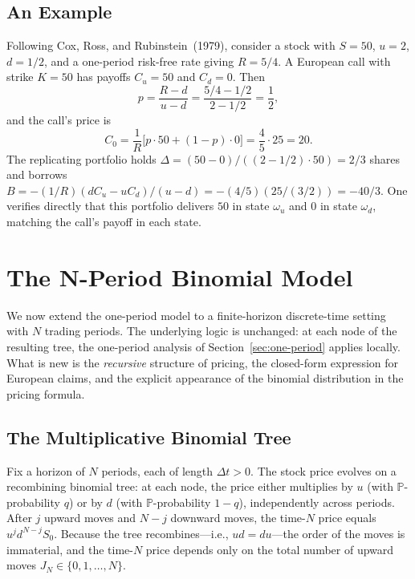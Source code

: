 \documentclass[11pt,a4paper]{article}
\theoremstyle{plain}
\theoremstyle{definition}
\newcommand{\Prob}{\mathbb{P}}
\begin{document}
\subsection{An Example}
\label{subsec:example-1period}

Following Cox, Ross, and Rubinstein~(1979), consider a stock with
$S = 50$, $u = 2$, $d = 1/2$, and a one-period risk-free rate giving
$R = 5/4$. A European call with strike $K = 50$ has payoffs $C_u = 50$
and $C_d = 0$. Then
\[
p = \frac{R - d}{u - d} = \frac{5/4 - 1/2}{2 - 1/2} = \frac{1}{2},
\]
and the call's price is
\[
C_0 = \frac{1}{R}\bigl[p \cdot 50 + (1-p) \cdot 0\bigr]
    = \frac{4}{5} \cdot 25 = 20.
\]
The replicating portfolio holds $\Delta = (50 - 0) / ((2 - 1/2) \cdot 50)
= 2/3$ shares and borrows $B = -(1/R)(d C_u - u C_d)/(u - d) =
-(4/5)(25/(3/2)) = -40/3$. One verifies directly that this portfolio
delivers $50$ in state $\omega_u$ and $0$ in state $\omega_d$, matching
the call's payoff in each state.

\section{The N-Period Binomial Model}
\label{sec:n-period}

We now extend the one-period model to a finite-horizon discrete-time
setting with $N$ trading periods. The underlying logic is unchanged: at
each node of the resulting tree, the one-period analysis of
Section~\ref{sec:one-period} applies locally. What is new is the
\emph{recursive} structure of pricing, the closed-form expression for
European claims, and the explicit appearance of the binomial distribution
in the pricing formula.

\subsection{The Multiplicative Binomial Tree}
\label{subsec:tree}

Fix a horizon of $N$ periods, each of length $\Delta t > 0$. The stock
price evolves on a recombining binomial tree: at each node, the price
either multiplies by $u$ (with $\Prob$-probability $q$) or by $d$ (with
$\Prob$-probability $1-q$), independently across periods. After $j$
upward moves and $N - j$ downward moves, the time-$N$ price equals
$u^j d^{N-j} S_0$. Because the tree recombines---i.e., $ud = du$---the
order of the moves is immaterial, and the time-$N$ price depends only on
the total number of upward moves $J_N \in \{0, 1, \dots, N\}$.
\end{document}
